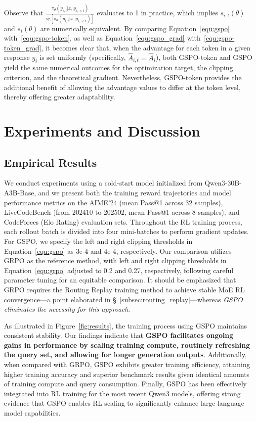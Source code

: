 Observe that $\frac{ \pi_{\theta} (y_{i,t} | x, y_{i,<t}) }{ \mathrm{sg} \left[ \pi_{\theta} (y_{i,t} | x, y_{i,<t}) \right] }$ evaluates to 1 in practice, which implies $s_{i,t}(\theta)$ and $s_{i}(\theta)$ are numerically equivalent. By comparing Equation~\eqref{equ:gspo} with~\eqref{equ:gspo-token}, as well as Equation~\eqref{equ:gspo_grad} with~\eqref{equ:gspo-token_grad}, it becomes clear that, when the advantage for each token in a given response $y_i$ is set uniformly (specifically, $\widehat{A}_{i,t} = \widehat{A}_{i}$), both GSPO-token and GSPO yield the same numerical outcomes for the optimization target, the clipping criterion, and the theoretical gradient. Nevertheless, GSPO-token provides the additional benefit of allowing the advantage values to differ at the token level, thereby offering greater adaptability.

\section{Experiments and Discussion}

\subsection{Empirical Results}

We conduct experiments using a cold-start model initialized from Qwen3-30B-A3B-Base, and we present both the training reward trajectories and model performance metrics on the AIME'24 (mean Pass@1 across 32 samples), LiveCodeBench (from 202410 to 202502, mean Pass@1 across 8 samples), and CodeForces (Elo Rating) evaluation sets. Throughout the RL training process, each rollout batch is divided into four mini-batches to perform gradient updates. For GSPO, we specify the left and right clipping thresholds in Equation~\eqref{equ:gspo} as 3e-4 and 4e-4, respectively. Our comparison utilizes GRPO as the reference method, with left and right clipping thresholds in Equation~\eqref{equ:grpo} adjusted to 0.2 and 0.27, respectively, following careful parameter tuning for an equitable comparison. It should be emphasized that GRPO requires the Routing Replay training method to achieve stable MoE RL convergence—a point elaborated in \S~\ref{subsec:routing_replay}—whereas \textit{GSPO eliminates the necessity for this approach}.

As illustrated in Figure~\ref{fig:results}, the training process using GSPO maintains consistent stability. Our findings indicate that \textbf{GSPO facilitates ongoing gains in performance by scaling training compute, routinely refreshing the query set, and allowing for longer generation outputs}. Additionally, when compared with GRPO, GSPO exhibits greater training efficiency, attaining higher training accuracy and superior benchmark results given identical amounts of training compute and query consumption. Finally, GSPO has been effectively integrated into RL training for the most recent Qwen3 models, offering strong evidence that GSPO enables RL scaling to significantly enhance large language model capabilities.

